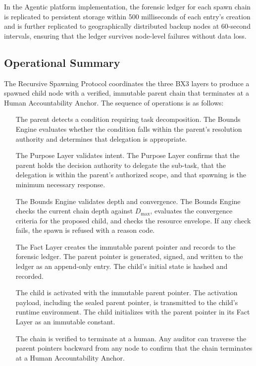 In the Agentic platform implementation, the forensic ledger for each spawn chain is replicated to persistent storage within 500 milliseconds of each entry's creation and is further replicated to geographically distributed backup nodes at 60-second intervals, ensuring that the ledger survives node-level failures without data loss.


\subsection{Operational Summary}

The Recursive Spawning Protocol coordinates the three BX3 layers to produce a spawned child node with a verified, immutable parent chain that terminates at a Human Accountability Anchor. The sequence of operations is as follows:

\begin{enumerate}\itemsep0pt
\item[The parent detects a condition requiring task decomposition.] The Bounds Engine evaluates whether the condition falls within the parent's resolution authority and determines that delegation is appropriate.

\item[The Purpose Layer validates intent.] The Purpose Layer confirms that the parent holds the decision authority to delegate the sub-task, that the delegation is within the parent's authorized scope, and that spawning is the minimum necessary response.

\item[The Bounds Engine validates depth and convergence.] The Bounds Engine checks the current chain depth against $D_{\max}$, evaluates the convergence criteria for the proposed child, and checks the resource envelope. If any check fails, the spawn is refused with a reason code.

\item[The Fact Layer creates the immutable parent pointer and records to the forensic ledger.] The parent pointer is generated, signed, and written to the ledger as an append-only entry. The child's initial state is hashed and recorded.

\item[The child is activated with the immutable parent pointer.] The activation payload, including the sealed parent pointer, is transmitted to the child's runtime environment. The child initializes with the parent pointer in its Fact Layer as an immutable constant.

\item[The chain is verified to terminate at a human.] Any auditor can traverse the parent pointers backward from any node to confirm that the chain terminates at a Human Accountability Anchor.
\end{enumerate}

